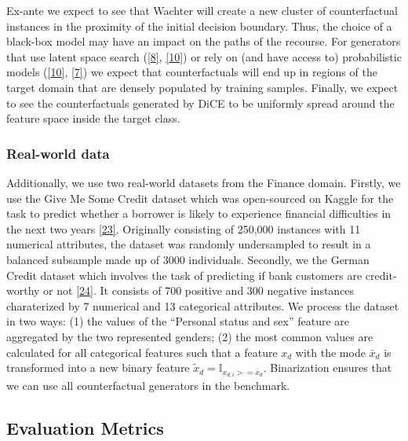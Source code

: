 \documentclass[
  conference]{IEEEtran}
\begin{document}
Ex-ante we expect to see that Wachter will create a new cluster of
counterfactual instances in the proximity of the initial decision
boundary. Thus, the choice of a black-box model may have an impact on
the paths of the recourse. For generators that use latent space search
(\protect\hyperlink{ref-joshi2019towards}{{[}8{]}},
\protect\hyperlink{ref-antoran2020getting}{{[}10{]}}) or rely on (and
have access to) probabilistic models
(\protect\hyperlink{ref-antoran2020getting}{{[}10{]}},
\protect\hyperlink{ref-schut2021generating}{{[}7{]}}) we expect that
counterfactuals will end up in regions of the target domain that are
densely populated by training samples. Finally, we expect to see the
counterfactuals generated by DiCE to be uniformly spread around the
feature space inside the target class.

\hypertarget{real-world-data}{%
\subsubsection{Real-world data}\label{real-world-data}}

Additionally, we use two real-world datasets from the Finance domain.
Firstly, we use the Give Me Some Credit dataset which was open-sourced
on Kaggle for the task to predict whether a borrower is likely to
experience financial difficulties in the next two years
\protect\hyperlink{ref-gmsc_data}{{[}23{]}}. Originally consisting of
250,000 instances with 11 numerical attributes, the dataset was randomly
undersampled to result in a balanced subsample made up of 3000
individuals. Secondly, we the German Credit dataset which involves the
task of predicting if bank customers are credit-worthy or not
\protect\hyperlink{ref-germancredit1994}{{[}24{]}}. It consists of 700
positive and 300 negative instances charaterized by 7 numerical and 13
categorical attributes. We process the dataset in two ways: (1) the
values of the ``Personal status and sex'' feature are aggregated by the
two represented genders; (2) the most common values are calculated for
all categorical features such that a feature \(x_d\) with the mode
\(\bar{x}_d\) is transformed into a new binary feature
\(\tilde{x}_d=\mathbb{I}_{x_{d,i}>=\bar{x}_d}\). Binarization ensures
that we can use all counterfactual generators in the benchmark.

\hypertarget{sec-method-metrics}{%
\subsection{Evaluation Metrics}\label{sec-method-metrics}}
\end{document}
